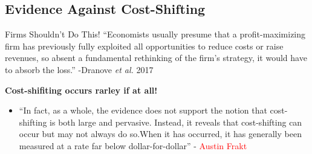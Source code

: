 \documentclass[ucs,9pt]{beamer}
\begin{document}
\subsection{Evidence Against Cost-Shifting}





\begin{frame}{Firms Shouldn't Do This!}
``Economists usually presume that a profit-maximizing firm has previously fully exploited
all opportunities to reduce costs or raise revenues, so absent a fundamental rethinking of the firm's
strategy, it would have to absorb the loss.'' -Dranove \textit{et al.} 2017
\end{frame}

\begin{frame}
{\bf Cost-shifiting occurs rarley if at all!}
\begin{itemize}
\item ``In fact, as a whole, the
evidence does not support the notion that cost-shifting is both large and
pervasive. Instead, it reveals that cost-shifting can occur but may not
always do so.When it has occurred, it has generally been measured at a
rate far below dollar-for-dollar'' - \textcolor{red}{Austin Frakt}
\end{itemize}

\end{frame}
\end{document}
